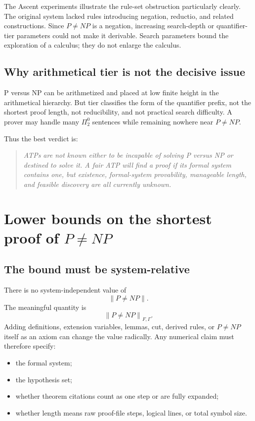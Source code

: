 \documentclass[11pt,letterpaper]{article}
\theoremstyle{named}
\newcommand{\prooflen}[2]{\left\lVert #1\right\rVert_{#2}}
\begin{document}
The Ascent experiments illustrate the rule-set obstruction particularly clearly. The original system lacked rules introducing negation, reductio, and related constructions. Since $P\ne NP$ is a negation, increasing search-depth or quantifier-tier parameters could not make it derivable. Search parameters bound the exploration of a calculus; they do not enlarge the calculus.

\subsection{Why arithmetical tier is not the decisive issue}

P versus NP can be arithmetized and placed at low finite height in the arithmetical hierarchy. But tier classifies the form of the quantifier prefix, not the shortest proof length, not reducibility, and not practical search difficulty. A prover may handle many $\Pi^0_2$ sentences while remaining nowhere near $P\ne NP$.

Thus the best verdict is:

\begin{quote}
\emph{ATPs are not known either to be incapable of solving P versus NP or destined to solve it. A fair ATP will find a proof if its formal system contains one, but existence, formal-system provability, manageable length, and feasible discovery are all currently unknown.}
\end{quote}

\section{Lower bounds on the shortest proof of \texorpdfstring{$P\ne NP$}{P not equal to NP}}

\subsection{The bound must be system-relative}

There is no system-independent value of
\[
\|P\ne NP\|.
\]
The meaningful quantity is
\[
\prooflen{P\ne NP}{F,\Gamma}.
\]
Adding definitions, extension variables, lemmas, cut, derived rules, or $P\ne NP$ itself as an axiom can change the value radically. Any numerical claim must therefore specify:

\begin{itemize}
\item the formal system;
\item the hypothesis set;
\item whether theorem citations count as one step or are fully expanded;
\item whether length means raw proof-file steps, logical lines, or total symbol size.
\end{itemize}
\end{document}
